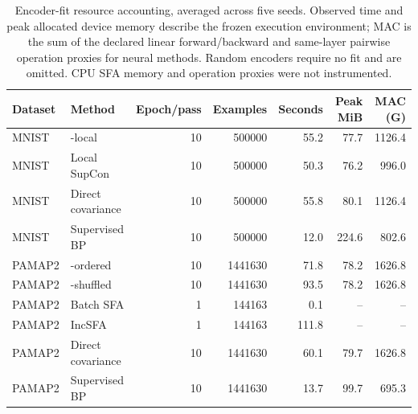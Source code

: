 \begin{table}[H]
\centering
\small
\caption{Encoder-fit resource accounting, averaged across five seeds. Observed time and peak allocated device memory describe the frozen execution environment; MAC is the sum of the declared linear forward/backward and same-layer pairwise operation proxies for neural methods. Random encoders require no fit and are omitted. CPU SFA memory and operation proxies were not instrumented.}
\label{tab:confirmatory-resources}
\begin{tabular}{llrrrrr}
\toprule
Dataset & Method & Epoch/pass & Examples & Seconds & Peak MiB & MAC (G) \\
\midrule
MNIST & \TeReL{}-local & 10 & 500000 & 55.2 & 77.7 & 1126.4 \\
MNIST & Local SupCon & 10 & 500000 & 50.3 & 76.2 & 996.0 \\
MNIST & Direct covariance & 10 & 500000 & 55.8 & 80.1 & 1126.4 \\
MNIST & Supervised BP & 10 & 500000 & 12.0 & 224.6 & 802.6 \\
PAMAP2 & \TeReL{}-ordered & 10 & 1441630 & 71.8 & 78.2 & 1626.8 \\
PAMAP2 & \TeReL{}-shuffled & 10 & 1441630 & 93.5 & 78.2 & 1626.8 \\
PAMAP2 & Batch SFA & 1 & 144163 & 0.1 & -- & -- \\
PAMAP2 & IncSFA & 1 & 144163 & 111.8 & -- & -- \\
PAMAP2 & Direct covariance & 10 & 1441630 & 60.1 & 79.7 & 1626.8 \\
PAMAP2 & Supervised BP & 10 & 1441630 & 13.7 & 99.7 & 695.3 \\
\bottomrule
\end{tabular}
\end{table}

